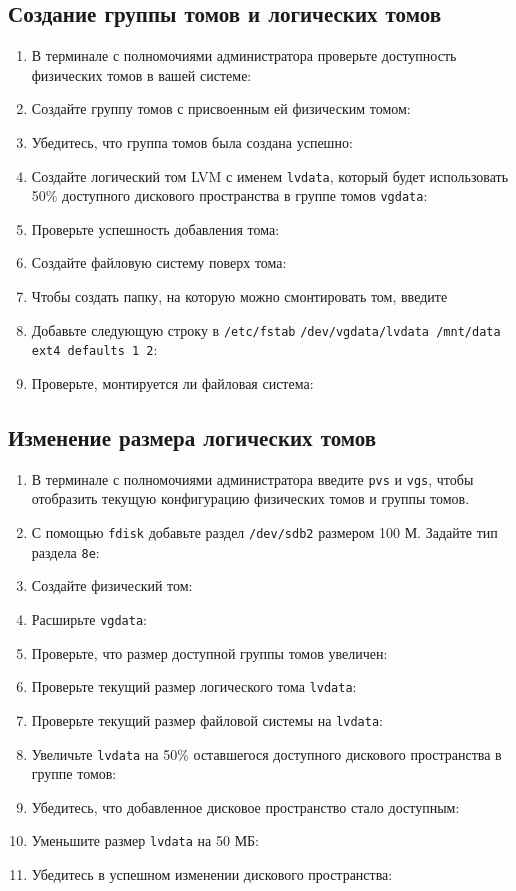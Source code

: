 \documentclass[12pt]{article}
\begin{document}
\subsection{Создание группы томов и логических томов}
\begin{enumerate}
	\item В терминале с полномочиями администратора проверьте доступность физических
	      томов в вашей системе:
	\item Создайте группу томов с присвоенным ей физическим томом:
	\item Убедитесь, что группа томов была создана успешно:
	\item Создайте логический том LVM с именем \texttt{lvdata}, который будет использовать
	      50\% доступного дискового пространства в группе томов \texttt{vgdata}:
	\item Проверьте успешность добавления тома:
	\item Создайте файловую систему поверх тома:
	\item Чтобы создать папку, на которую можно смонтировать том, введите
	\item Добавьте следующую строку в \texttt{/etc/fstab} \texttt{/dev/vgdata/lvdata /mnt/data ext4 defaults 1 2}:
	\item Проверьте, монтируется ли файловая система:
\end{enumerate}

\subsection{Изменение размера логических томов}
\begin{enumerate}
	\item В терминале с полномочиями администратора введите \texttt{pvs} и \texttt{vgs}, чтобы отобразить
	      текущую конфигурацию физических томов и группы томов.
	\item С помощью \texttt{fdisk} добавьте раздел \texttt{/dev/sdb2} размером 100 М. Задайте тип раздела \texttt{8e}:
	\item Создайте физический том:
	\item Расширьте \texttt{vgdata}:
	\item Проверьте, что размер доступной группы томов увеличен:
	\item Проверьте текущий размер логического тома \texttt{lvdata}:
	\item Проверьте текущий размер файловой системы на \texttt{lvdata}:
	\item Увеличьте \texttt{lvdata} на 50\% оставшегося доступного дискового пространства в группе томов:
	\item Убедитесь, что добавленное дисковое пространство стало доступным:
	\item Уменьшите размер \texttt{lvdata} на 50 МБ:
	\item Убедитесь в успешном изменении дискового пространства:
\end{enumerate}
\end{document}
